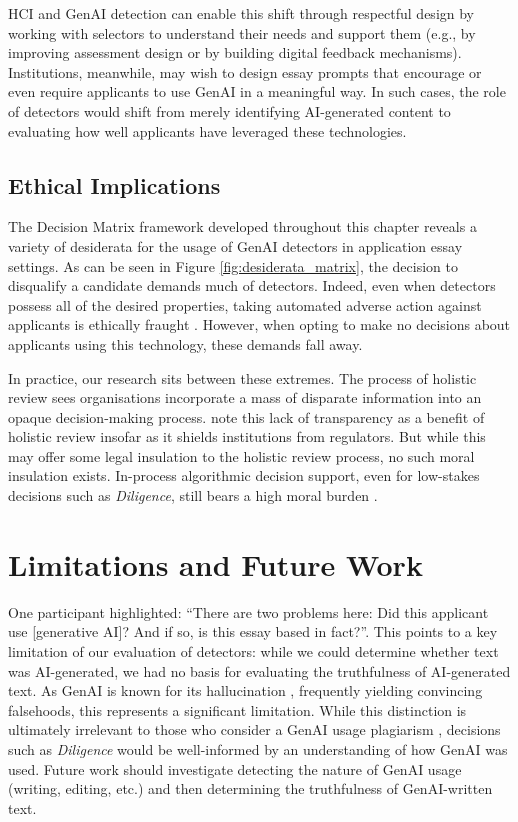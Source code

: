 HCI and GenAI detection can enable this shift through respectful design \cite{VanKleek_Seymour_Binns_Shadbolt_2018} by working with selectors to understand their needs and support them (e.g., by improving assessment design or by building digital feedback mechanisms). Institutions, meanwhile, may wish to design essay prompts that encourage or even require applicants to use GenAI in a meaningful way. In such cases, the role of detectors would shift from merely identifying AI-generated content to evaluating how well applicants have leveraged these technologies.

\subsection{Ethical Implications}
The Decision Matrix framework developed throughout this chapter reveals a variety of desiderata for the usage of GenAI detectors in application essay settings. As can be seen in Figure \ref{fig:desiderata_matrix}, the decision to disqualify a candidate demands much of detectors. Indeed, even when detectors possess all of the desired properties, taking automated adverse action against applicants is ethically fraught \cite{Lashkari_Cheng_2023}. However, when opting to make no decisions about applicants using this technology, these demands fall away.

In practice, our research sits between these extremes. The process of holistic review sees organisations incorporate a mass of disparate information into an opaque decision-making process. \textcite{hirschman_dequantifying_2016} note this lack of transparency as a benefit of holistic review insofar as it shields institutions from regulators. But while this may offer some legal insulation to the holistic review process, no such moral insulation exists. In-process algorithmic decision support, even for low-stakes decisions such as \emph{Diligence}, still bears a high moral burden \cite{Lashkari_Cheng_2023}.

\section{Limitations and Future Work}
One participant highlighted: ``There are two problems here: Did this applicant use [generative AI]? And if so, is this essay based in fact?''. This points to a key limitation of our evaluation of detectors: while we could determine whether text was AI-generated, we had no basis for evaluating the truthfulness of AI-generated text. As GenAI is known for its hallucination \cite{alkaissi_artificial_2023}, frequently yielding convincing falsehoods, this represents a significant limitation. While this distinction is ultimately irrelevant to those who consider a GenAI usage plagiarism \cite{h_holden_thorp_chatgpt_2023}, decisions such as \emph{Diligence} would be well-informed by an understanding of how GenAI was used. Future work should investigate detecting the nature of GenAI usage (writing, editing, etc.) and then determining the truthfulness of GenAI-written text.

